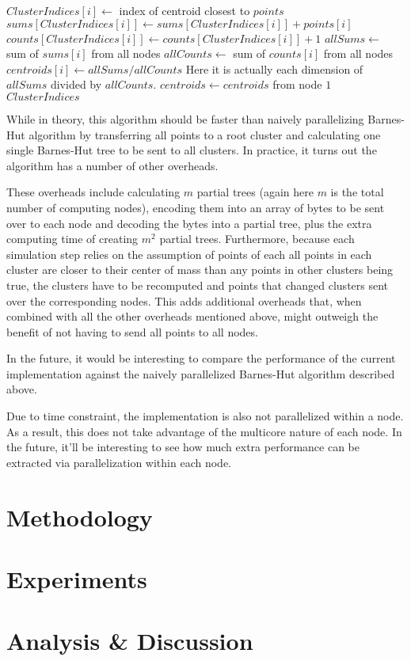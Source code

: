 \documentclass{article}
\begin{document}
\begin{algorithm}
\caption{}
\begin{algorithmic}[1]
				\State $ClusterIndices[i] \gets$ index of centroid closest to $points$
			\EndFor
				\State $sums[ClusterIndices[i]] \gets sums[ClusterIndices[i]] + points[i]$
				\State $counts[ClusterIndices[i]] \gets counts[ClusterIndices[i]] + 1$
			\EndFor
					\State $allSums \gets$ sum of $sums[i]$ from all nodes
					\State $allCounts \gets$ sum of $counts[i]$ from all nodes
					\State $centroids[i] \gets allSums / allCounts$ \Comment Here it is actually
					each dimension of $allSums$ divided by $allCounts$.
				\EndFor
			\EndIf
			\State $centroids \gets centroids$ from node $1$
		\EndWhile
		\Return $ClusterIndices$
	\EndFunction
\end{algorithmic}
\end{algorithm}

While in theory, this algorithm should be faster than naively parallelizing Barnes-Hut algorithm by
transferring all points to a root cluster and calculating one single Barnes-Hut tree to be sent to
all clusters. In practice, it turns out the algorithm has a number of other overheads.

These overheads include calculating \(m\) partial trees (again here \(m\) is the total number of
computing nodes), encoding them into an array of bytes to be sent over to each node and decoding the
bytes into a partial tree, plus the extra computing time of creating \(m^2\) partial trees.
Furthermore, because each simulation step relies on the assumption of points of each all points in
each cluster are closer to their center of mass than any points in other clusters being true, the
clusters have to be recomputed and points that changed clusters sent over the corresponding nodes.
This adds additional overheads that, when combined with all the other overheads mentioned above,
might outweigh the benefit of not having to send all points to all nodes.

In the future, it would be interesting to compare the performance of the current implementation
against the naively parallelized Barnes-Hut algorithm described above.

Due to time constraint, the implementation is also not parallelized within a node. As a result, this
does not take advantage of the multicore nature of each node. In the future, it'll be interesting to
see how much extra performance can be extracted via parallelization within each node.

\section*{Methodology}


\section*{Experiments}

\section*{Analysis \& Discussion}
\end{document}
